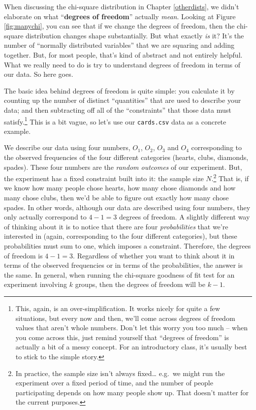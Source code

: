 \documentclass[
  11pt,
  a4paper,
  twoside,symmetric,openright]{book}
\theoremstyle{break}
\theoremstyle{break}
\begin{document}
When discussing the chi-square distribution in Chapter \ref{otherdists}, we didn't elaborate on what ``\textbf{degrees of freedom}'' actually \emph{mean}. Looking at Figure \ref{fig:manychi}, you can see that if we change the degrees of freedom, then the chi-square distribution changes shape substantially. But what exactly \emph{is} it? It's the number of ``normally distributed variables'' that we are squaring and adding together. But, for most people, that's kind of abstract and not entirely helpful. What we really need to do is try to understand degrees of freedom in terms of our data. So here goes.

The basic idea behind degrees of freedom is quite simple: you calculate it by counting up the number of distinct ``quantities'' that are used to describe your data; and then subtracting off all of the ``constraints'' that those data must satisfy.\footnote{This, again, is an over-simplification. It works nicely for quite a few situations, but every now and then, we'll come across degrees of freedom values that aren't whole numbers. Don't let this worry you too much -- when you come across this, just remind yourself that ``degrees of freedom'' is actually a bit of a messy concept. For an introductory class, it's usually best to stick to the simple story.} This is a bit vague, so let's use our \texttt{cards.csv} data as a concrete example.

We describe our data using four numbers, \(O_1\), \(O_2\), \(O_3\) and \(O_4\) corresponding to the observed frequencies of the four different categories (hearts, clubs, diamonds, spades). These four numbers are the \emph{random outcomes} of our experiment. But, the experiment has a fixed constraint built into it: the sample size \(N\).\footnote{In practice, the sample size isn't always fixed\ldots{} e.g.~we might run the experiment over a fixed period of time, and the number of people participating depends on how many people show up. That doesn't matter for the current purposes.} That is, if we know how many people chose hearts, how many chose diamonds and how many chose clubs, then we'd be able to figure out exactly how many chose spades. In other words, although our data are described using four numbers, they only actually correspond to \(4-1 = 3\) degrees of freedom. A slightly different way of thinking about it is to notice that there are four \emph{probabilities} that we're interested in (again, corresponding to the four different categories), but these probabilities must sum to one, which imposes a constraint. Therefore, the degrees of freedom is \(4-1 = 3\). Regardless of whether you want to think about it in terms of the observed frequencies or in terms of the probabilities, the answer is the same. In general, when running the chi-square goodness of fit test for an experiment involving \(k\) groups, then the degrees of freedom will be \(k-1\).
\end{document}
